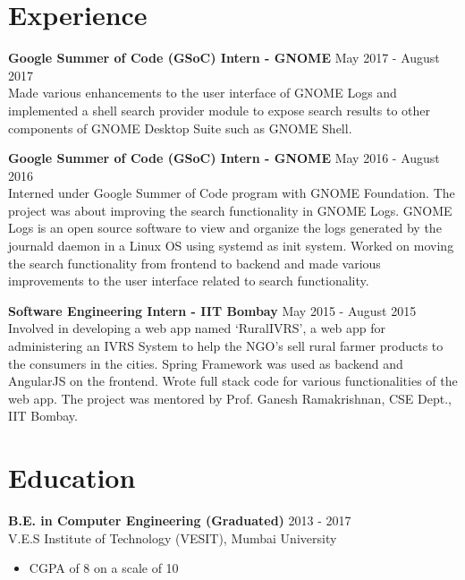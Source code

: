 \documentclass[12pt,margin, centered]{res}
\begin{document}
\begin{resume}



\section{Experience}
\vspace{10mm}

\textbf{Google Summer of Code (GSoC) Intern - GNOME} \hfill May 2017 - August 2017\\
Made various enhancements to the user interface of GNOME Logs and implemented a shell search provider module to expose search results to other components of GNOME Desktop Suite such as GNOME Shell.

\vspace{2mm}

\textbf{Google Summer of Code (GSoC) Intern - GNOME} \hfill May 2016 - August 2016\\
Interned under Google Summer of Code program with GNOME Foundation. The project was about improving the search functionality in GNOME Logs. GNOME Logs is an open source software to view and organize the logs generated by the journald daemon in a Linux OS using systemd as init system. Worked on moving the search functionality from frontend to backend and made various improvements to the user interface related to search functionality.

\vspace{2mm}

\textbf{Software Engineering Intern - IIT Bombay} \hfill May 2015 - August 2015\\
Involved in developing a web app named ‘RuralIVRS’, a web app for administering an IVRS System to help the NGO's sell rural farmer products to the consumers in the cities. Spring Framework was used as backend and AngularJS on the frontend. Wrote full stack code for various functionalities of the web app. The project was mentored by Prof. Ganesh Ramakrishnan, CSE Dept., IIT Bombay.



\section{Education}
\vspace{10mm}
\textbf{B.E. in Computer Engineering (Graduated)} \hfill 2013 - 2017 \\
V.E.S Institute of Technology (VESIT), Mumbai University
\begin{itemize}
 \item CGPA of 8 on a scale of 10
\end{itemize}


\end{resume}
\end{document}
